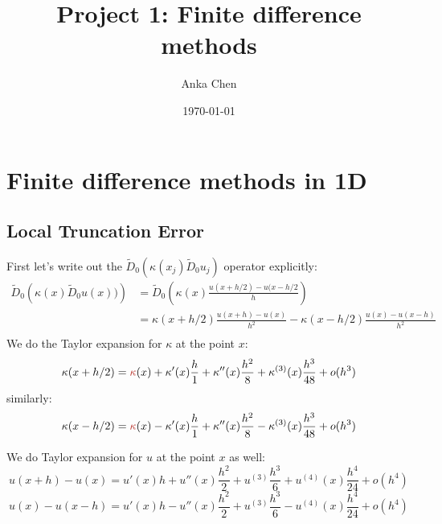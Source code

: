 \documentclass[12pt, fullpage,letterpaper]{article}
\title{Project 1: Finite difference methods}
\author{Anka Chen}
\date{\today}
\newcommand{\an}[1]{{\leavevmode\color{BrickRed}{#1}}}
\begin{document}
\maketitle

\an{You should really keep the problem statement in here; otherwise you will forget what this report is talking about if you read it later.}

\section{Finite difference methods in 1D}
\subsection{Local Truncation Error}
First let's write out the $\widetilde{D}_0 \left( \kappa(x_j) \widetilde{D}_0 u_j \right)$ operator explicitly:
\begin{equation}
\begin{split}
    \widetilde{D}_0 \left( \kappa(x) \widetilde{D}_0 u(x)) \right) &= \widetilde{D}_0 \left(\kappa(x) \frac{u(x+h/2) - u(x-h/2}{h} \right)\\
    &= \kappa(x+h/2)\frac{u(x+h) - u(x)}{h^2} - \kappa(x-h/2)\frac{u(x) - u(x-h)}{h^2} \\
\end{split}
\end{equation}
We do the Taylor expansion for $\kappa$ at the point $x$:
\begin{equation}
  \kappa(x+h/2)=\an{\kappa}(x) + \kappa'(x)\frac{h}{1} + \kappa''(x)\frac{h^2}{8}  + \kappa^{(3)}(x)\frac{h^3}{48} + o(h^3)
\end{equation}
similarly:
\begin{equation}
  \kappa(x-h/2)=\an{\kappa}(x) - \kappa'(x)\frac{h}{1} + \kappa''(x)\frac{h^2}{8}  - \kappa^{(3)}(x)\frac{h^3}{48} + o(h^3)
\end{equation}

We do Taylor expansion for $u$ at the point $x$ as well: 
\begin{equation}
u(x+h) - u(x)= u'(x)h + u''(x)\frac{h^2}{2} + u^{(3)}\frac{h^3}{6} + u^{(4)}(x)\frac{h^4}{24} + o(h^4)
\end{equation}
\begin{equation}
u(x) - u(x-h)= u'(x)h - u''(x)\frac{h^2}{2} + u^{(3)}\frac{h^3}{6} - u^{(4)}(x)\frac{h^4}{24} + o(h^4)
\end{equation}
\end{document}
